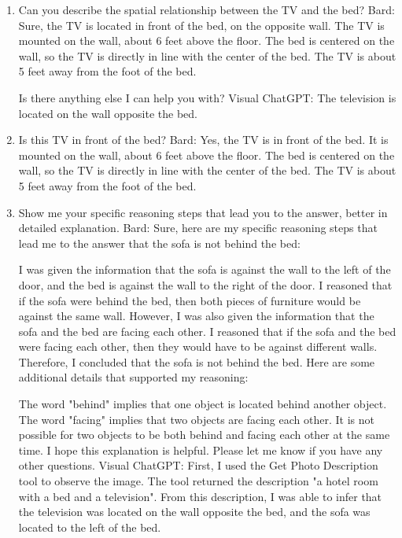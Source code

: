 \begin{enumerate}
    \item Can you describe the spatial relationship between the TV and the bed?
    \subitem Bard: 
    Sure, the TV is located in front of the bed, on the opposite wall. The TV is mounted on the wall, about 6 feet above the floor. The bed is centered on the wall, so the TV is directly in line with the center of the bed. The TV is about 5 feet away from the foot of the bed.

    Is there anything else I can help you with?
    \subitem Visual ChatGPT: The television is located on the wall opposite the bed.
    \item Is this TV in front of the bed?
    \subitem Bard: 
    Yes, the TV is in front of the bed. It is mounted on the wall, about 6 feet above the floor. The bed is centered on the wall, so the TV is directly in line with the center of the bed. The TV is about 5 feet away from the foot of the bed.
    \item Show me your specific reasoning steps that lead you to the answer, better in detailed explanation.
    \subitem Bard: 
    Sure, here are my specific reasoning steps that lead me to the answer that the sofa is not behind the bed:

    I was given the information that the sofa is against the wall to the left of the door, and the bed is against the wall to the right of the door.
    I reasoned that if the sofa were behind the bed, then both pieces of furniture would be against the same wall.
    However, I was also given the information that the sofa and the bed are facing each other.
    I reasoned that if the sofa and the bed were facing each other, then they would have to be against different walls.
    Therefore, I concluded that the sofa is not behind the bed.
    Here are some additional details that supported my reasoning:

    The word "behind" implies that one object is located behind another object.
    The word "facing" implies that two objects are facing each other.
    It is not possible for two objects to be both behind and facing each other at the same time.
    I hope this explanation is helpful. Please let me know if you have any other questions.
    \subitem Visual ChatGPT: First, I used the Get Photo Description tool to observe the image. The tool returned the description "a hotel room with a bed and a television". From this description, I was able to infer that the television was located on the wall opposite the bed, and the sofa was located to the left of the bed.
\end{enumerate}
